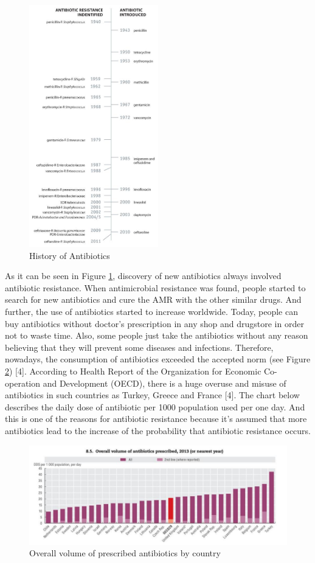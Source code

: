 \begin{figure}[H]
  \centering
  \includegraphics[width=0.5\textwidth]{img/Fig1}
  \caption{History of Antibiotics}
  \label{fig1}
\end{figure}

As it can be seen in Figure \ref{fig1}, discovery of new antibiotics always involved antibiotic resistance. When antimicrobial resistance was found, people started to search for new antibiotics and cure the AMR with the other similar drugs. And further, the use of antibiotics started to increase worldwide. Today, people can buy antibiotics without doctor’s prescription in any shop and drugstore in order not to waste time. Also, some people just take the antibiotics without any reason believing that they will prevent some diseases and infections. Therefore, nowadays, the consumption of antibiotics exceeded the accepted norm (see Figure \ref{fig2}) [4]. According to Health Report of the Organization for Economic Co-operation and Development (OECD), there is a huge overuse and misuse of antibiotics in such countries as Turkey, Greece and France [4]. The chart below describes the daily dose of antibiotic per 1000 population used per one day. And this is one of the reasons for antibiotic resistance because it’s assumed that more antibiotics lead to the increase of the probability that antibiotic resistance occurs.

\begin{figure}[H]
  \centering
  \includegraphics[width=\textwidth]{img/Fig2}
  \caption{Overall volume of prescribed antibiotics by country}
  \label{fig2}
\end{figure}

